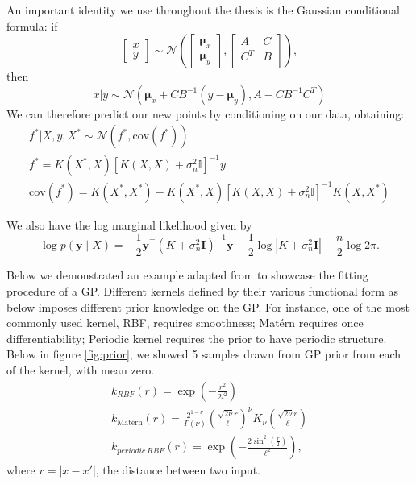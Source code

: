 \documentclass{statsmsc}
\begin{document}
An important identity we use throughout the thesis is the Gaussian conditional formula: if
$$
  \begin{bmatrix}
    x\\y
  \end{bmatrix} 
  \sim \mathcal{N}
  \left(
    \begin{bmatrix}
      \mathbf{\mu}_x\\
      \mathbf{\mu}_y
    \end{bmatrix},
    \begin{bmatrix}
      A & C \\
      C^T & B\\
    \end{bmatrix}
  \right), 
$$ 
then 
\begin{equation}
  x|y\sim \mathcal{N}\left(\mathbf{\mu}_x+CB^{-1}(y-\mathbf{\mu}_y),A-CB^{-1}C^T\right)
  \label{equ:normal_condtion}
\end{equation}
We can therefore predict our new points by conditioning on our data, obtaining: 
\begin{equation*}
\begin{gathered}
f^*|X, y, X^* \sim \mathcal{N} \left(\overline{f^*}, \mathrm{cov}(f^*)\right)\\ 
\overline{f^*} = K(X^*, X)[K(X,X)+\sigma^2_n\mathbb{I}]^{-1}y\\
\mathrm{cov}(f^*) = K(X^*, X^*) - K(X^*, X)[K(X, X)+\sigma^2_n\mathbb{I}]^{-1}K(X, X^*)
\end{gathered}
\end{equation*}

We also have the log marginal likelihood given by 
$$
\log p(\mathbf{y} \mid X)=-\frac{1}{2} \mathbf{y}^{\top}\left(K+\sigma_{n}^{2} \mathbf{I}\right)^{-1} \mathbf{y}-\frac{1}{2} \log \left|K+\sigma_{n}^{2} \mathbf{I}\right|-\frac{n}{2} \log 2 \pi.
$$

Below we demonstrated an example adapted from \cite{GPflow2017} to showcase the fitting procedure of a GP.
Different kernels defined by their various functional form as below imposes different prior knowledge on the GP.
For instance, one of the most commonly used kernel, RBF, requires smoothness; Matérn requires once differentiability; Periodic kernel requires the prior to have periodic structure.
Below in figure \ref{fig:prior}, we showed 5 samples drawn from GP prior from each of the kernel, with mean zero.
\begin{equation*}
  \begin{gathered}
    k_{RBF}(r) = \exp(-\frac{r^2}{2l^2}) \\
    k_{\text {Matérn}}(r)=\frac{2^{1-\nu}}{\Gamma(\nu)}\left(\frac{\sqrt{2 \nu} r}{\ell}\right)^{\nu} K_{\nu}\left(\frac{\sqrt{2 \nu} r}{\ell}\right) \\
    k_{periodic\ RBF}(r)=\exp \left(-\frac{2 \sin ^{2}\left(\frac{r}{2}\right)}{\ell^{2}}\right),
  \end{gathered}
\end{equation*}
where $r=|x-x'|$, the distance between two input.
\end{document}
